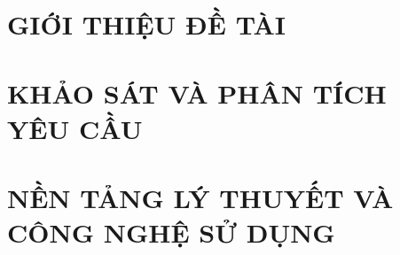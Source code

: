 \documentclass[a4paper,12pt,oneside]{report}
\title{\bf \TITLE}
\author{\AUTHOR}
\theoremstyle{definition}
\begin{document}
\hypersetup{pageanchor=false}

\clearpage
{}
\setcounter{page}{3}
\hypersetup{pageanchor=true}
\pagestyle{plain}

\clearpage

\clearpage


\clearpage
\renewcommand*\contentsname{MỤC LỤC}
\setcounter{tocdepth}{2}
\tableofcontents
\clearpage

\renewcommand{\listfigurename}{DANH MỤC HÌNH VẼ}
{\let\oldnumberline\numberline
\renewcommand{\numberline}{Hình~\oldnumberline}
\listoffigures}
\newpage


\renewcommand{\listtablename}{DANH MỤC BẢNG BIỂU}
{\let\oldnumberline\numberline
\renewcommand{\numberline}{Bảng~\oldnumberline}
\listoftables}

\newpage



% 


\clearpage

\pagestyle{fancy}
\fancyhf{}
\fancyhead[L]{\small\nouppercase{\leftmark}}
\fancyfoot[C]{\thepage}

\chapter{GIỚI THIỆU ĐỀ TÀI}
\label{chapter:Introduction}

\newpage
\chapter{KHẢO SÁT VÀ PHÂN TÍCH YÊU CẦU}
\label{chapter:Related_works}



\newpage
\chapter{NỀN TẢNG LÝ THUYẾT VÀ CÔNG NGHỆ SỬ DỤNG}
\label{chapter:Methodology}

\end{document}
